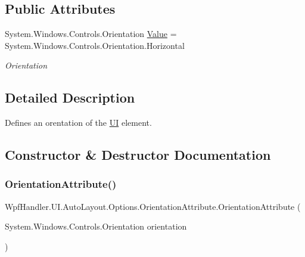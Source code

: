 \subsection*{Public Attributes}
\begin{DoxyCompactItemize}
\item 
System.\+Windows.\+Controls.\+Orientation \mbox{\hyperlink{class_wpf_handler_1_1_u_i_1_1_auto_layout_1_1_options_1_1_orientation_attribute_aa0e346725fdf25d2172e0811e12000ed}{Value}} = System.\+Windows.\+Controls.\+Orientation.\+Horizontal
\begin{DoxyCompactList}\small\item\em Orientation \end{DoxyCompactList}\end{DoxyCompactItemize}


\subsection{Detailed Description}
Defines an orentation of the \mbox{\hyperlink{namespace_wpf_handler_1_1_u_i}{UI}} element. 



\subsection{Constructor \& Destructor Documentation}
\mbox{\label{class_wpf_handler_1_1_u_i_1_1_auto_layout_1_1_options_1_1_orientation_attribute_a1a2b97e91de843f677c37aac422b3667}} 
\subsubsection{\texorpdfstring{Orientation\+Attribute()}{OrientationAttribute()}}
{\footnotesize\ttfamily Wpf\+Handler.\+U\+I.\+Auto\+Layout.\+Options.\+Orientation\+Attribute.\+Orientation\+Attribute (\begin{DoxyParamCaption}\item[{System.\+Windows.\+Controls.\+Orientation}]{orientation }\end{DoxyParamCaption})}




